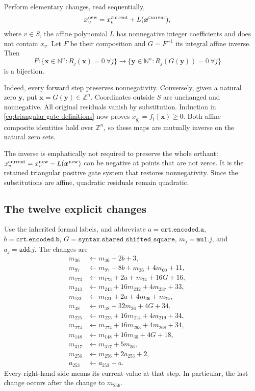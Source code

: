 Perform elementary changes, read sequentially,
\begin{equation}
 x_v^{\rm new}=x_v^{\rm current}+L(\boldsymbol x^{\rm current}),
 \label{eq:nonnegative-affine-shear}
\end{equation}
where $v\in S$, the affine polynomial $L$ has nonnegative integer
coefficients and does not contain $x_v$.  Let $F$ be their composition and
$G=F^{-1}$ its integral affine inverse.  Then
\begin{equation}
 F:\{\boldsymbol x\in\mathbb N^n:R_j(\boldsymbol x)=0\ \forall j\}
 \longrightarrow
 \{\boldsymbol y\in\mathbb N^n:R_j(G(\boldsymbol y))=0\ \forall j\}
 \label{eq:natural-chart-bijection}
\end{equation}
is a bijection.

Indeed, every forward step preserves nonnegativity.  Conversely, given a
natural zero $\boldsymbol y$, put $\boldsymbol x=G(\boldsymbol y)\in
\mathbb Z^n $.  Coordinates outside $ S$ are unchanged and nonnegative.
All original residuals vanish by substitution.  Induction in
\eqref{eq:triangular-gate-definitions} now proves $x_{g_i}=f_i(\boldsymbol
x)\geq 0 $.  Both affine composite identities hold over $\mathbb Z^n$, so
these maps are mutually inverse on the natural zero sets.

The inverse is emphatically not required to preserve the whole orthant:
$x_v^{\rm current}=x_v^{\rm new}-L(\boldsymbol x^{\rm new})$ can be
negative at points that are not zeros.  It is the retained triangular
positive gate system that restores nonnegativity.  Since the substitutions
are affine, quadratic residuals remain quadratic.

\subsection{The twelve explicit changes}

Use the inherited formal labels, and abbreviate
$a=\texttt{crt.encoded.a}$, $b=\texttt{crt.encoded.b}$,
$G=\texttt{syntax.shared\_shifted\_square}$,
$m_j=\texttt{mul.}j$, and $a_j=\texttt{add.}j$.  The changes are
\begin{align*}
 m_{36}&\gets m_{36}+2b+3,\\
 m_{97}&\gets m_{97}+8b+m_{36}+4m_{60}+11,\\
 m_{173}&\gets m_{173}+2a+m_{74}+16G+16,\\
 m_{243}&\gets m_{243}+16m_{232}+4m_{237}+33,\\
 m_{131}&\gets m_{131}+2a+4m_{36}+m_{74},\\
 m_{48}&\gets m_{48}+32m_{36}+4G+34,\\
 m_{225}&\gets m_{225}+16m_{214}+4m_{219}+34,\\
 m_{274}&\gets m_{274}+16m_{263}+4m_{268}+34,\\
 m_{148}&\gets m_{148}+16m_{36}+4G+18,\\
 m_{317}&\gets m_{317}+5m_{36},\\
 m_{256}&\gets m_{256}+2a_{253}+2,\\
 a_{253}&\gets a_{253}+a.
\end{align*}
Every right-hand side means its current value at that step.  In particular,
the last change occurs after the change to $m_{256}$.

